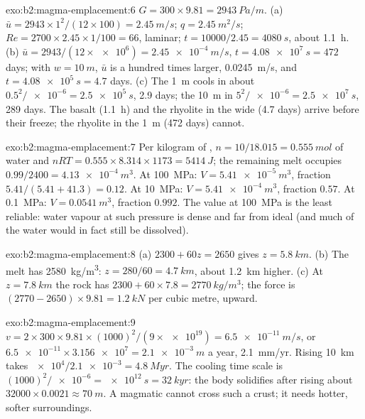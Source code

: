 \begin{solution}{exo:b2:magma-emplacement:6}
$G = 300\times9.81 = \qty{2943}{Pa/m}$. (a) $\bar u = 2943\times1^2/(12\times100) =
\qty{2.45}{m/s}$; $q = \qty{2.45}{m^2/s}$; $Re = 2700\times2.45\times1/100 = 66$, laminar;
$t = 10000/2.45 = \qty{4080}{s}$, about \qty{1.1}{h}. (b) $\bar u =
2943/(12\times\num{e6}) = \qty{2.45e-4}{m/s}$, $t = \qty{4.08e7}{s} = 472$ days; with
$w = \qty{10}{m}$, $\bar u$ is a hundred times larger, \qty{0.0245}{m/s}, and $t =
\qty{4.08e5}{s} = 4.7$ days. (c) The \qty{1}{m}  cools in about
$0.5^2/\num{e-6} = \qty{2.5e5}{s}$, 2.9 days; the \qty{10}{m}  in $5^2/\num{e-6} =
\qty{2.5e7}{s}$, 289 days. The basalt (\qty{1.1}{h}) and the rhyolite in the wide
 (4.7 days) arrive before their  freeze; the rhyolite in the
\qty{1}{m}  (472 days) cannot.
\end{solution}

\begin{solution}{exo:b2:magma-emplacement:7}
Per kilogram of , $n = 10/18.015 = \qty{0.555}{mol}$ of water and $nRT =
0.555\times8.314\times1173 = \qty{5414}{J}$; the remaining melt occupies $0.99/2400 =
\qty{4.13e-4}{m^3}$. At \qty{100}{MPa}: $V = \qty{5.41e-5}{m^3}$, fraction
$5.41/(5.41 + 41.3) = 0.12$. At \qty{10}{MPa}: $V = \qty{5.41e-4}{m^3}$, fraction
$0.57$. At \qty{0.1}{MPa}: $V = \qty{0.0541}{m^3}$, fraction $0.992$. The value at
\qty{100}{MPa} is the least reliable: water vapour at such pressure is dense and
far from ideal (and much of the water would in fact still be dissolved).
\end{solution}

\begin{solution}{exo:b2:magma-emplacement:8}
(a) $2300 + 60z = 2650$ gives $z = \qty{5.8}{km}$. (b) The melt has
\qty{2580}{kg/m^3}: $z = 280/60 = \qty{4.7}{km}$, about \qty{1.2}{km} higher. (c)
At $z = \qty{7.8}{km}$ the rock has $2300 + 60\times7.8 = \qty{2770}{kg/m^3}$; the
force is $(2770 - 2650)\times9.81 = \qty{1.2}{kN}$ per cubic metre, upward.
\end{solution}

\begin{solution}{exo:b2:magma-emplacement:9}
$v = 2\times300\times9.81\times(1000)^2/(9\times\num{e19}) = \qty{6.5e-11}{m/s}$, or
$\num{6.5e-11}\times\num{3.156e7} = \qty{2.1e-3}{m}$ a year, \qty{2.1}{mm/yr}. Rising
\qty{10}{km} takes $\num{e4}/\num{2.1e-3} = \qty{4.8}{Myr}$. The cooling time scale
is $(1000)^2/\num{e-6} = \qty{e12}{s} = \qty{32}{kyr}$: the body solidifies after
rising about $32000\times0.0021 \approx \qty{70}{m}$. A magmatic  cannot cross
such a crust; it needs hotter, softer surroundings.
\end{solution}

